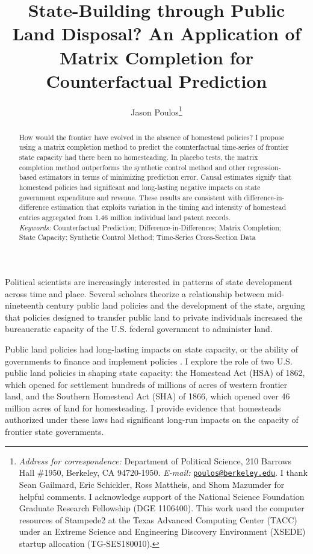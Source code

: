 \documentclass[hidelinks,12pt]{article}
\title{State-Building through Public Land Disposal? An Application of Matrix Completion for Counterfactual Prediction}
\author[ ]{Jason Poulos\thanks{\emph{Address for correspondence:} Department of Political Science, 210 Barrows Hall \#1950, Berkeley, CA 94720-1950. \emph{E-mail:} \href{mailto:poulos@berkeley.edu}{\nolinkurl{poulos@berkeley.edu}}. I thank Sean Gailmard, Eric Schickler, Ross Mattheis, and Shom Mazumder for helpful comments. I acknowledge support of the National Science Foundation Graduate Research Fellowship (DGE 1106400). This work used the computer resources of Stampede2 at the Texas Advanced Computing Center (TACC) under an Extreme Science and Engineering Discovery Environment (XSEDE) startup allocation (TG-SES180010).}}
\affil[ ]{University of California, Berkeley}
\date{}
\begin{document}
 
 
\begin{singlespacing}
\maketitle  
\end{singlespacing}

\thispagestyle{empty}

\begin{abstract}  %
\noindent
How would the frontier have evolved in the absence of homestead policies? I propose using a matrix completion method to predict the counterfactual time-series of frontier state capacity had there been no homesteading. In placebo tests, the matrix completion method outperforms the synthetic control method and other regression-based estimators in terms of minimizing prediction error. Causal estimates signify that homestead policies had significant and long-lasting negative impacts on state government expenditure and revenue. These results are consistent with difference-in-difference estimation that exploits variation in the timing and intensity of homestead entries aggregated from 1.46 million individual land patent records.
\vspace{10mm}\\
\emph{Keywords:} Counterfactual Prediction; Difference-in-Differences; Matrix Completion; State Capacity; Synthetic Control Method; Time-Series Cross-Section Data
\end{abstract}	

\pagebreak
{}%

Political scientists are increasingly interested in patterns of state development across time and place. Several scholars \citep[e.g.,][]{bensel1990,murtazashvili2013political,frymer2014rush} theorize a relationship between mid-nineteenth century public land policies and the development of the state, arguing that policies designed to transfer public land to private individuals increased the bureaucratic capacity of the U.S. federal government to administer land. 

Public land policies had long-lasting impacts on state capacity, or the ability of governments to finance and implement policies \citep{besley2010state}. I explore the role of two U.S. public land policies in shaping state capacity: the Homestead Act (HSA) of 1862, which opened for settlement hundreds of millions of acres of western frontier land, and the Southern Homestead Act (SHA) of 1866, which opened over 46 million acres of land for homesteading. I provide evidence that homesteads authorized under these laws had significant long-run impacts on the capacity of frontier state governments. 
\end{document}
